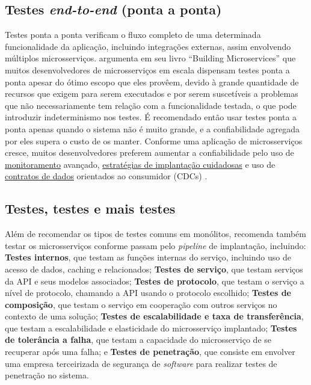 \subsection{Testes \emph{end-to-end} (ponta a ponta)}\label{subsecao-testes-endtoend}
Testes ponta a ponta verificam o fluxo completo de uma determinada funcionalidade da aplicação, incluindo integrações externas, assim envolvendo múltiplos microsserviços.  argumenta em seu livro “Building Microservices” que muitos desenvolvedores de microsserviços em escala dispensam testes ponta a ponta apesar do ótimo escopo que eles provêem, devido à grande quantidade de recursos que exigem para serem executados e por serem suscetíveis a problemas que não necessariamente tem relação com a funcionalidade testada, o que pode introduzir indeterminismo nos testes. É recomendado então usar testes ponta a ponta apenas quando o sistema não é muito grande, e a confiabilidade agregada por eles supera o custo de os manter. Conforme uma aplicação de microsserviços cresce, muitos desenvolvedores preferem aumentar a confiabilidade pelo uso de \hyperref[observabilidade-monitoramento]{monitoramento} avançado, \hyperref[estrategias-implantacao]{estratégias de implantação cuidadosas} e uso de \hyperref[subsecao-contratos-de-dados]{contratos de dados} orientados ao consumidor (CDCs) 
\cite{livro-building-microservices}.


\subsection{Testes, testes e mais testes}
Além de recomendar os tipos de testes comuns em monólitos,  recomenda também testar os microsserviços conforme passam pelo \emph{pipeline} de implantação, incluindo: \textbf{Testes internos}, que testam as funções internas do serviço, incluindo uso de acesso de dados, caching e relacionados; \textbf{Testes de serviço}, que testam serviços da API e seus modelos associados; \textbf{Testes de protocolo}, que testam o serviço a nível de protocolo, chamando a API usando o protocolo escolhido; \textbf{Testes de composição}, que testam o serviço em cooperação com outros serviços no contexto de uma solução; \textbf{Testes de escalabilidade e taxa de transferência}, que testam a escalabilidade e elasticidade do microsserviço implantado; \textbf{Testes de tolerância a falha}, que testam a capacidade do microsserviço de se recuperar após uma falha; e \textbf{Testes de penetração}, que consiste em envolver uma empresa terceirizada de segurança de \emph{software} para realizar testes de penetração no sistema. \cite{Familiar2015}

